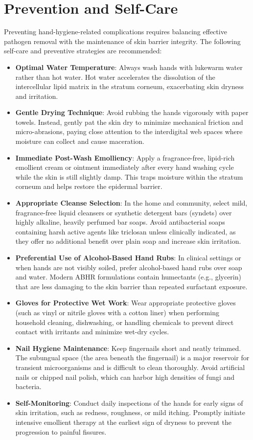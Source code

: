\section*{Prevention and Self-Care}
Preventing hand-hygiene-related complications requires balancing effective pathogen removal with the maintenance of skin barrier integrity. The following self-care and preventive strategies are recommended:
\begin{itemize}
    \item \textbf{Optimal Water Temperature}: Always wash hands with lukewarm water rather than hot water. Hot water accelerates the dissolution of the intercellular lipid matrix in the stratum corneum, exacerbating skin dryness and irritation.
    \item \textbf{Gentle Drying Technique}: Avoid rubbing the hands vigorously with paper towels. Instead, gently pat the skin dry to minimize mechanical friction and micro-abrasions, paying close attention to the interdigital web spaces where moisture can collect and cause maceration.
    \item \textbf{Immediate Post-Wash Emolliency}: Apply a fragrance-free, lipid-rich emollient cream or ointment immediately after every hand washing cycle while the skin is still slightly damp. This traps moisture within the stratum corneum and helps restore the epidermal barrier.
    \item \textbf{Appropriate Cleanse Selection}: In the home and community, select mild, fragrance-free liquid cleansers or synthetic detergent bars (syndets) over highly alkaline, heavily perfumed bar soaps. Avoid antibacterial soaps containing harsh active agents like triclosan unless clinically indicated, as they offer no additional benefit over plain soap and increase skin irritation.
    \item \textbf{Preferential Use of Alcohol-Based Hand Rubs}: In clinical settings or when hands are not visibly soiled, prefer alcohol-based hand rubs over soap and water. Modern ABHR formulations contain humectants (e.g., glycerin) that are less damaging to the skin barrier than repeated surfactant exposure.
    \item \textbf{Gloves for Protective Wet Work}: Wear appropriate protective gloves (such as vinyl or nitrile gloves with a cotton liner) when performing household cleaning, dishwashing, or handling chemicals to prevent direct contact with irritants and minimize wet-dry cycles.
    \item \textbf{Nail Hygiene Maintenance}: Keep fingernails short and neatly trimmed. The subungual space (the area beneath the fingernail) is a major reservoir for transient microorganisms and is difficult to clean thoroughly. Avoid artificial nails or chipped nail polish, which can harbor high densities of fungi and bacteria.
    \item \textbf{Self-Monitoring}: Conduct daily inspections of the hands for early signs of skin irritation, such as redness, roughness, or mild itching. Promptly initiate intensive emollient therapy at the earliest sign of dryness to prevent the progression to painful fissures.
\end{itemize}

